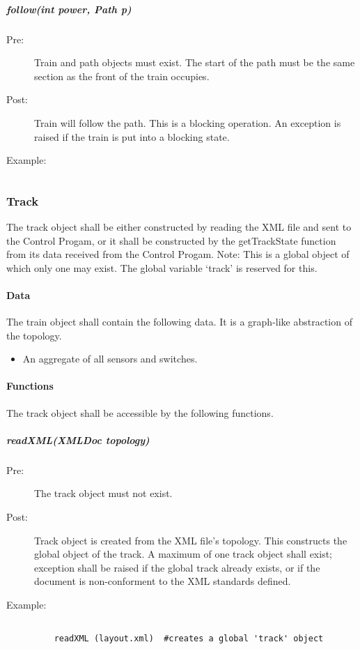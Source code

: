 \documentclass[a4paper,11pt,notitlepage]{article}
\def\CS{Control Progam\xspace} \def\LC{Local Copy of Train State\xspace} \def\TN{Track Node\xspace}
\begin{document}
\subparagraph{follow(int power, Path p)} 
\begin{description}
\item[\hspace{1cm}Pre:] Train and path objects must exist. The start of the path must be the same section as the front of the train occupies. 
\item[\hspace{1cm}Post:] Train will follow the path. This is a blocking operation. An exception is raised if the train is put into a blocking state.
\item[\hspace{1cm}Example:]
\begin{verbatim}

\end{verbatim}
\end{description}


\subsubsection{Track}
The track object shall be either constructed by reading the XML file and sent to the \CS, or it shall be constructed by the getTrackState function from its data received from the \CS.
Note: This is a global object of which only one may exist. The global variable `track' is reserved for this.
\paragraph{Data}
The train object shall contain the following data. It is a graph-like abstraction of the topology.
\begin{itemize}
\item An aggregate of all sensors and switches.
\end{itemize}
\paragraph{Functions}
The track object shall be accessible by the following functions.

\subparagraph{readXML(XMLDoc topology)}
\begin{description}
\item[\hspace{1cm}Pre:] The track object must not exist.
\item[\hspace{1cm}Post:] Track object is created from the XML file's topology. This constructs the global object of the track. A maximum of one track object shall exist; exception shall be raised if the global track already exists, or if the document is non-conforment to the XML standards defined.
\item[\hspace{1cm}Example:]
\begin{verbatim}

    readXML (layout.xml)  #creates a global 'track' object
\end{verbatim}
\end{description}
\end{document}
